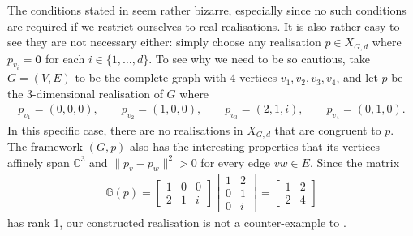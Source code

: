 \documentclass[11pt]{article}
\theoremstyle{definition}
\numberwithin{equation}{section}
\begin{document}
The conditions stated in  seem rather bizarre,
especially since no such conditions are required if we restrict ourselves to real realisations.
It is also rather easy to see they are not necessary either:
simply choose any realisation $p \in X_{G,d}$ where $p_{v_i} = \mathbf{0}$ for each $i \in \{1,\ldots,d\}$.
To see why we need to be so cautious,
take $G=(V,E)$ to be the complete graph with 4 vertices $v_1,v_2,v_3,v_4$,
and let $p$ be the 3-dimensional realisation of $G$ where
\begin{align*}
	p_{v_1} = (0,0,0), \qquad p_{v_2} = (1,0,0), \qquad p_{v_3} = (2,1,i), \qquad p_{v_4} = (0,1,0).
\end{align*}
In this specific case, there are no realisations in $X_{G,d}$ that are congruent to $p$.
The framework $(G,p)$ also has the interesting properties that its vertices affinely span $\mathbb{C}^3$ and $\|p_v-p_w\|^2 >0$ for every edge $vw \in E$.
Since the matrix
\begin{align*}
	\mathbb{G}(p) =
	\begin{bmatrix}
		1 & 0 & 0 \\
		2 & 1 & i
	\end{bmatrix}
	\begin{bmatrix}
		1 & 2 \\
		0 & 1 \\
		0 & i
	\end{bmatrix}
	=
	\begin{bmatrix}
		1 & 2 \\
		2 & 4
	\end{bmatrix}
\end{align*}
has rank 1,
our constructed realisation is not a counter-example to .
\end{document}
